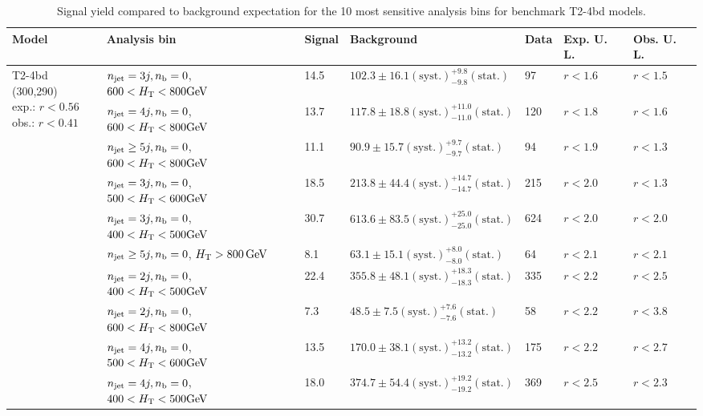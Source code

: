 \begin{table}[h!] 
  \scriptsize
  \caption{ 
Signal yield compared to background expectation for the 10 most sensitive analysis bins 
for benchmark T2-4bd models.
  \label{tab:sigBenchmarksYields_T2-4bd}}
  \centering 
  \begin{tabular}{ lllllll } 
    \hline 
    \hline 
    Model & Analysis bin & Signal & Background & Data & Exp. U. L. & Obs. U. L. \\ \hline
\multirow{10}{*}{\parbox[t]{2cm}{T2-4bd (300,290)\\exp.: $r<0.56$\\obs.: $r<0.41$}}
 & $n_{\mathrm{jet}} =3j,n_{\text{b}} =0$, $600 < \mbox{$H_\text{T}$} < 800 \mathrm{GeV}$ & 14.5 & $102.3 \pm 16.1 \mathrm{(syst.)} ^{+9.8}_{-9.8} \mathrm{(stat.)}$ & 97 & $r < 1.6$ & $r < 1.5$\\ 
 & $n_{\mathrm{jet}} =4j,n_{\text{b}} =0$, $600 < \mbox{$H_\text{T}$} < 800 \mathrm{GeV}$ & 13.7 & $117.8 \pm 18.8 \mathrm{(syst.)} ^{+11.0}_{-11.0} \mathrm{(stat.)}$ & 120 & $r < 1.8$ & $r < 1.6$\\ 
 & $n_{\mathrm{jet}} \geq5j,n_{\text{b}} =0$, $600 < \mbox{$H_\text{T}$} < 800 \mathrm{GeV}$ & 11.1 & $90.9 \pm 15.7 \mathrm{(syst.)} ^{+9.7}_{-9.7} \mathrm{(stat.)}$ & 94 & $r < 1.9$ & $r < 1.3$\\ 
 & $n_{\mathrm{jet}} =3j,n_{\text{b}} =0$, $500 < \mbox{$H_\text{T}$} < 600 \mathrm{GeV}$ & 18.5 & $213.8 \pm 44.4 \mathrm{(syst.)} ^{+14.7}_{-14.7} \mathrm{(stat.)}$ & 215 & $r < 2.0$ & $r < 1.3$\\ 
 & $n_{\mathrm{jet}} =3j,n_{\text{b}} =0$, $400 < \mbox{$H_\text{T}$} < 500 \mathrm{GeV}$ & 30.7 & $613.6 \pm 83.5 \mathrm{(syst.)} ^{+25.0}_{-25.0} \mathrm{(stat.)}$ & 624 & $r < 2.0$ & $r < 2.0$\\ 
 & $n_{\mathrm{jet}} \geq5j,n_{\text{b}} =0$, $\mbox{$H_\text{T}$} > 800 \, \mathrm{GeV}$ & 8.1 & $63.1 \pm 15.1 \mathrm{(syst.)} ^{+8.0}_{-8.0} \mathrm{(stat.)}$ & 64 & $r < 2.1$ & $r < 2.1$\\ 
 & $n_{\mathrm{jet}} =2j,n_{\text{b}} =0$, $400 < \mbox{$H_\text{T}$} < 500 \mathrm{GeV}$ & 22.4 & $355.8 \pm 48.1 \mathrm{(syst.)} ^{+18.3}_{-18.3} \mathrm{(stat.)}$ & 335 & $r < 2.2$ & $r < 2.5$\\ 
 & $n_{\mathrm{jet}} =2j,n_{\text{b}} =0$, $600 < \mbox{$H_\text{T}$} < 800 \mathrm{GeV}$ & 7.3 & $48.5 \pm 7.5 \mathrm{(syst.)} ^{+7.6}_{-7.6} \mathrm{(stat.)}$ & 58 & $r < 2.2$ & $r < 3.8$\\ 
 & $n_{\mathrm{jet}} =4j,n_{\text{b}} =0$, $500 < \mbox{$H_\text{T}$} < 600 \mathrm{GeV}$ & 13.5 & $170.0 \pm 38.1 \mathrm{(syst.)} ^{+13.2}_{-13.2} \mathrm{(stat.)}$ & 175 & $r < 2.2$ & $r < 2.7$\\ 
 & $n_{\mathrm{jet}} =4j,n_{\text{b}} =0$, $400 < \mbox{$H_\text{T}$} < 500 \mathrm{GeV}$ & 18.0 & $374.7 \pm 54.4 \mathrm{(syst.)} ^{+19.2}_{-19.2} \mathrm{(stat.)}$ & 369 & $r < 2.5$ & $r < 2.3$\\ \hline
    \hline
  \end{tabular}
\end{table}

